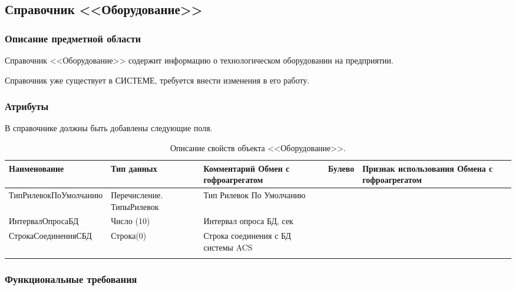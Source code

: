 \subsection{Справочник <<Оборудование>>}
\label{spr:eqpt}


\subsubsection{Описание предметной области}

Справочник <<Оборудование>> содержит информацию о технологическом оборудовании на предприятии.

Справочник уже существует в СИСТЕМЕ, требуется внести изменения в его работу.

\subsubsection{Атрибуты}

В справочнике должны быть добавлены следующие поля.

\pc
\begin{longtable}{|p{50mm}|p{30mm}|p{78mm}|}
\hline
{\bf Наименование} & {\bf Тип данных} &  {\bf Комментарий} \endhead
\hline 
   Обмен с гофроагрегатом & Булево & Признак использования Обмена с гофроагрегатом \\
   \hline
   ТипРилевокПоУмолчанию & Перечисление. ТипыРилевок & Тип Рилевок По Умолчанию \\
   \hline
   ИнтервалОпросаБД & Число (10) & Интервал опроса БД, сек \\
   \hline
   СтрокаСоединенияСБД & Строка(0) & Строка соединения с БД системы ACS \\
   \hline
\caption{Описание свойств объекта <<Оборудование>>.}
\label{tab:tdb_eqpt}
\end{longtable} 





\subsubsection{Функциональные требования}

